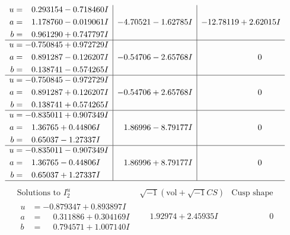 \documentclass[1p]{elsarticle_modified}
\theoremstyle{definition}
\newcommand{\I}{\sqrt{-1}}
\begin{document}
$$\begin{array}{c|c|c}
\begin{aligned}
u &= \phantom{-}0.293154 - 0.718460 I \\
a &= \phantom{-}1.178760 - 0.019061 I \\
b &= \phantom{-}0.961290 + 0.747797 I\end{aligned}
 & -4.70521 - 1.62785 I & -12.78119 + 2.62015 I \\ \hline\begin{aligned}
u &= -0.750845 + 0.972729 I \\
a &= \phantom{-}0.891287 - 0.126207 I \\
b &= \phantom{-}0.138741 - 0.574265 I\end{aligned}
 & -0.54706 - 2.65768 I & \phantom{-0.000000 } 0 \\ \hline\begin{aligned}
u &= -0.750845 - 0.972729 I \\
a &= \phantom{-}0.891287 + 0.126207 I \\
b &= \phantom{-}0.138741 + 0.574265 I\end{aligned}
 & -0.54706 + 2.65768 I & \phantom{-0.000000 } 0 \\ \hline\begin{aligned}
u &= -0.835011 + 0.907349 I \\
a &= \phantom{-}1.36765 + 0.44806 I \\
b &= \phantom{-}0.65037 - 1.27337 I\end{aligned}
 & \phantom{-}1.86996 - 8.79177 I & \phantom{-0.000000 } 0 \\ \hline\begin{aligned}
u &= -0.835011 - 0.907349 I \\
a &= \phantom{-}1.36765 - 0.44806 I \\
b &= \phantom{-}0.65037 + 1.27337 I\end{aligned}
 & \phantom{-}1.86996 + 8.79177 I & \phantom{-0.000000 } 0\\
 \hline 
 \end{array}$$\newpage$$\begin{array}{c|c|c}  
\text{Solutions to }I^u_{2}& \I (\text{vol} + \sqrt{-1}CS) & \text{Cusp shape}\\
 \hline 
\begin{aligned}
u &= -0.879347 + 0.893897 I \\
a &= \phantom{-}0.311886 + 0.304169 I \\
b &= \phantom{-}0.794571 + 1.007140 I\end{aligned}
 & \phantom{-}1.92974 + 2.45935 I & \phantom{-0.000000 } 0 \\ \hline\begin{aligned}

\end{aligned}
\end{array}$$
\end{document}

